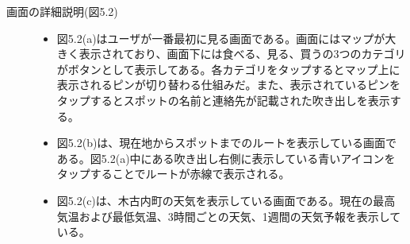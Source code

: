 \begin{description}
\item[画面の詳細説明(図5.2)]\mbox{}
\begin{itemize}
 \item 図5.2(a)はユーザが一番最初に見る画面である。画面にはマップが大きく表示されており、画面下には食べる、見る、買うの3つのカテゴリがボタンとして表示してある。各カテゴリをタップするとマップ上に表示されるピンが切り替わる仕組みだ。また、表示されているピンをタップするとスポットの名前と連絡先が記載された吹き出しを表示する。
 \item 図5.2(b)は、現在地からスポットまでのルートを表示している画面である。図5.2(a)中にある吹き出し右側に表示している青いアイコンをタップすることでルートが赤線で表示される。
 \item 図5.2(c)は、木古内町の天気を表示している画面である。現在の最高気温および最低気温、3時間ごとの天気、1週間の天気予報を表示している。
\end{itemize}
\end{description}

